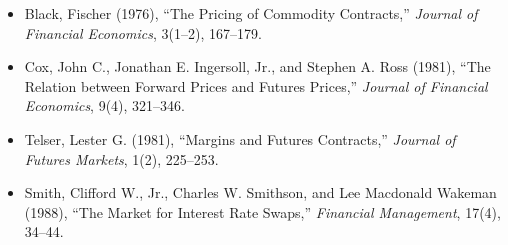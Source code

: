 \begin{itemize}

\item Black, Fischer (1976),
``The Pricing of Commodity Contracts,''
\emph{Journal of Financial Economics}, 3(1--2), 167--179.

\item Cox, John C., Jonathan E. Ingersoll, Jr., and Stephen A. Ross (1981),
``The Relation between Forward Prices and Futures Prices,''
\emph{Journal of Financial Economics}, 9(4), 321--346.

\item Telser, Lester G. (1981),
``Margins and Futures Contracts,''
\emph{Journal of Futures Markets}, 1(2), 225--253.

\item Smith, Clifford W., Jr., Charles W. Smithson, and Lee Macdonald Wakeman (1988),
``The Market for Interest Rate Swaps,''
\emph{Financial Management}, 17(4), 34--44.

\end{itemize}

